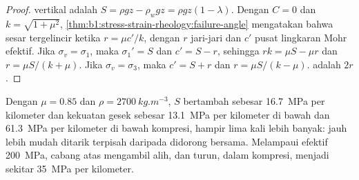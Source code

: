 \begin{proof}
 vertikal adalah $S = \rho g z - \rho_w g z = \rho g z(1-\lambda)$.
Dengan $C = 0$ dan $k = \sqrt{1+\mu^2}$, \cref{thm:b1:stress-strain-rheology:failure-angle} mengatakan bahwa sesar tergelincir ketika $r = \mu c'/k$, dengan $r$ jari-jari dan $c'$ pusat lingkaran Mohr efektif. Jika $\sigma_v = \sigma_1$, maka
$\sigma_1' = S$ dan $c' = S - r$, sehingga $rk = \mu S - \mu r$ dan $r = \mu S/(k+\mu)$. Jika $\sigma_v = \sigma_3$, maka $c' = S + r$ dan $r = \mu S/(k-\mu)$.  adalah $2r$.
\end{proof}

Dengan $\mu = 0.85$ dan $\rho = \qty{2700}{kg.m^{-3}}$, $S$ bertambah sebesar \qty{16.7}{MPa} per kilometer dan kekuatan gesek sebesar \qty{13.1}{MPa} per kilometer di bawah  dan \qty{61.3}{MPa} per kilometer di bawah kompresi, hampir lima kali lebih banyak:  jauh lebih mudah ditarik terpisah daripada didorong bersama. Melampaui  efektif \qty{200}{MPa}, cabang atas  mengambil alih, dan  turun, dalam kompresi, menjadi sekitar \qty{35}{MPa} per kilometer.

